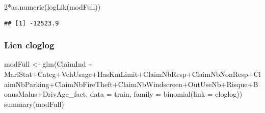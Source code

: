 \documentclass[
]{article}
\newenvironment{Shaded}{\begin{snugshade}}{\end{snugshade}}
\newcommand{\AttributeTok}[1]{\textcolor[rgb]{0.77,0.63,0.00}{#1}}
\newcommand{\DecValTok}[1]{\textcolor[rgb]{0.00,0.00,0.81}{#1}}
\newcommand{\FunctionTok}[1]{\textcolor[rgb]{0.00,0.00,0.00}{#1}}
\newcommand{\NormalTok}[1]{#1}
\newcommand{\OtherTok}[1]{\textcolor[rgb]{0.56,0.35,0.01}{#1}}
\newcommand{\SpecialCharTok}[1]{\textcolor[rgb]{0.00,0.00,0.00}{#1}}
\begin{document}
\begin{Shaded}
\begin{Highlighting}[]
\DecValTok{2}\SpecialCharTok{*}\FunctionTok{as.numeric}\NormalTok{(}\FunctionTok{logLik}\NormalTok{(modFull))}
\end{Highlighting}
\end{Shaded}

\begin{verbatim}
## [1] -12523.9
\end{verbatim}

\hypertarget{lien-cloglog}{%
\subsubsection{Lien cloglog}\label{lien-cloglog}}

\begin{Shaded}
\begin{Highlighting}[]
\NormalTok{modFull }\OtherTok{\textless{}{-}} \FunctionTok{glm}\NormalTok{(ClaimInd }\SpecialCharTok{\textasciitilde{}}\NormalTok{ MariStat}\SpecialCharTok{+}\NormalTok{Categ}\SpecialCharTok{+}\NormalTok{VehUsage}\SpecialCharTok{+}\NormalTok{HasKmLimit}\SpecialCharTok{+}\NormalTok{ClaimNbResp}\SpecialCharTok{+}\NormalTok{ClaimNbNonResp}\SpecialCharTok{+}\NormalTok{ClaimNbParking}\SpecialCharTok{+}\NormalTok{ClaimNbFireTheft}\SpecialCharTok{+}\NormalTok{ClaimNbWindscreen}\SpecialCharTok{+}\NormalTok{OutUseNb}\SpecialCharTok{+}\NormalTok{Risque}\SpecialCharTok{+}\NormalTok{BonusMalus}\SpecialCharTok{+}\NormalTok{DrivAge\_fact, }\AttributeTok{data =}\NormalTok{ train, }\AttributeTok{family =} \FunctionTok{binomial}\NormalTok{(}\AttributeTok{link =}\NormalTok{ cloglog))}
\FunctionTok{summary}\NormalTok{(modFull)}
\end{Highlighting}
\end{Shaded}
\end{document}

